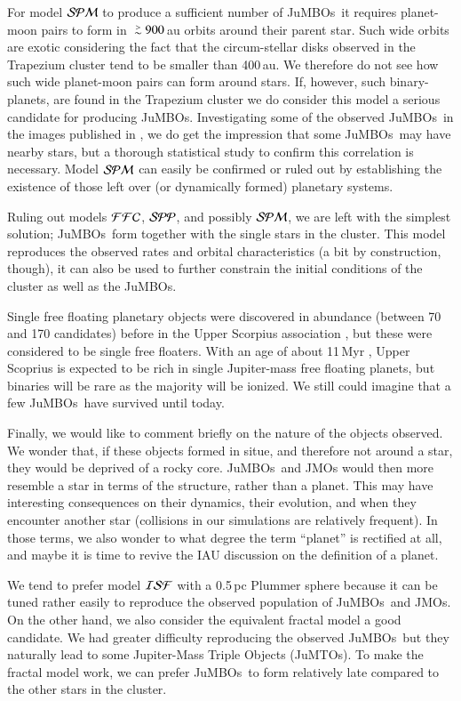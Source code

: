 \documentclass[submission,phys]{lib/SciPost}
\def\apgt{\ {\raise-.5ex\hbox{$\buildrel>\over\sim$}}\ }
\newcommand{\jumbos}{\mbox{JuMBOs}}
\begin{document}
For model ${\cal SPM}$ to produce a sufficient number of \jumbos\, it
requires planet-moon pairs to form in $\apgt 900$\,au orbits around
their parent star. Such wide orbits are exotic considering the fact
that the circum-stellar disks observed in the Trapezium cluster tend
to be smaller than 400\,au. We therefore do not see how such wide
planet-moon pairs can form around stars. If, however, such
binary-planets, are found in the Trapezium cluster we do consider this
model a serious candidate for producing \jumbos.  Investigating some
of the observed \jumbos\ in the images published in
\cite{2023arXiv231001231P}, we do get the impression that some
\jumbos\, may have nearby stars, but a thorough statistical study to
confirm this correlation is necessary.  Model ${\cal SPM}$ can easily
be confirmed or ruled out by establishing the existence of those left
over (or dynamically formed) planetary systems.

Ruling out models ${\cal FFC}$, ${\cal SPP}$, and possibly ${\cal
  SPM}$, we are left with the simplest solution; \jumbos\, form
together with the single stars in the cluster.  This model reproduces
the observed rates and orbital characteristics (a bit by construction,
though), it can also be used to further constrain the initial
conditions of the cluster as well as the \jumbos.

Single free floating planetary objects were discovered in abundance
(between 70 and 170 candidates) before in the Upper Scorpius
association \cite{2022NatAs...6...89M}, but these were considered to
be single free floaters.  With an age of about 11\,Myr
\cite{2022NatAs...6...89M}, Upper Scoprius is expected to be rich in
single Jupiter-mass free floating planets, but binaries will be rare
as the majority will be ionized. We still could imagine that a few
\jumbos\, have survived until today.

Finally, we would like to comment briefly on the nature of the objects
observed. We wonder that, if these objects formed in situe, and
therefore not around a star, they would be deprived of a rocky core.
\jumbos\, and JMOs would then more resemble a star in terms of the
structure, rather than a planet. This may have interesting
consequences on their dynamics, their evolution, and when they
encounter another star (collisions in our simulations are relatively
frequent). In those terms, we also wonder to what degree the term
``planet'' is rectified at all, and maybe it is time to revive the IAU
discussion on the definition of a planet.

We tend to prefer model ${\cal ISF}$ with a 0.5\,pc Plummer sphere
because it can be tuned rather easily to reproduce the observed
population of \jumbos\, and JMOs. On the other hand, we also consider
the equivalent fractal model a good candidate. We had greater
difficulty reproducing the observed \jumbos\, but they naturally lead
to some Jupiter-Mass Triple Objects (JuMTOs).  To make the fractal
model work, we can prefer \jumbos\, to form relatively late compared
to the other stars in the cluster.
\end{document}
